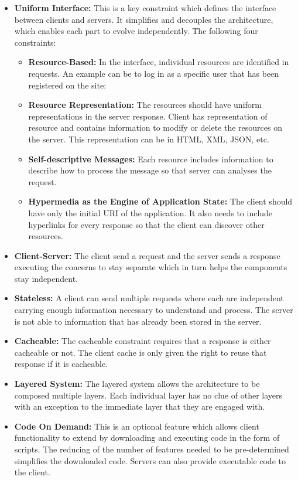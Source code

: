 \begin{itemize}
    \item \textbf{Uniform Interface:} This is a key constraint which defines the interface between clients and servers. It simplifies and decouples the architecture, which enables each part to evolve independently. The following four constraints:
    \begin{itemize}
        \item \textbf{Resource-Based:} In the interface, individual resources are identified in requests. An example can be to log in as a specific user that has been registered on the site:
        \item \textbf{Resource Representation:} The resources should have uniform representations in the server response. Client has representation of resource and contains information to modify or delete the resources on the server. This representation can be in HTML, XML, JSON, etc.
        \item \textbf{Self-descriptive Messages:} Each resource includes information to describe how to process the message so that server can analyses the request.
        \item \textbf{Hypermedia as the Engine of Application State:} The client should have only the initial URI of the application. It also needs to include hyperlinks for every response so that the client can discover other resources.
    \end{itemize}
    \item \textbf{Client-Server:} The client send a request and the server sends a response executing the concerns to stay separate which in turn helps the components stay independent.
    \item \textbf{Stateless:} A client can send multiple requests where each are independent carrying enough information necessary to understand and process. The server is not able to information that has already been stored in the server. 
    \item \textbf{Cacheable:} The cacheable constraint requires that a response is either cacheable or not. The client cache is only given the right to reuse that response if it is cacheable.
    \item \textbf{Layered System:} The layered system allows the architecture to be composed multiple layers. Each individual layer has no clue of other layers with an exception to the immediate layer that they are engaged with.
    \item \textbf{Code On Demand:} This is an optional feature which allows client functionality to extend by downloading and executing code in the form of scripts. The reducing of the number of features needed to be pre-determined simplifies the downloaded code. Servers can also provide executable code to the client.
\end{itemize}

